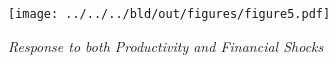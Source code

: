 \begin{figure}[h]
  \centering
  \texttt{[image: ../../../bld/out/figures/figure5.pdf]}
  \caption{\textit{Response to both Productivity and Financial Shocks}}
  \label{fig:figure5_update}
\end{figure}